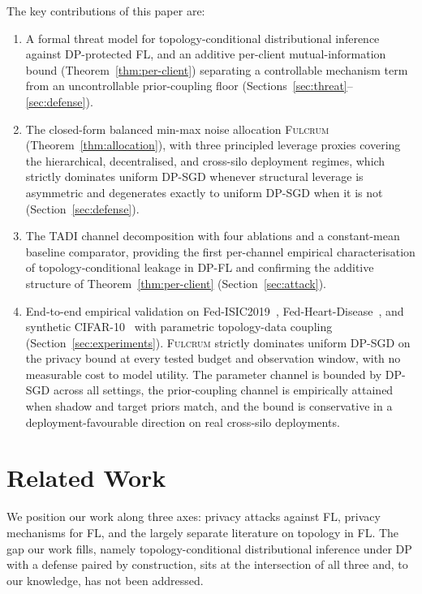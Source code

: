 \documentclass[letterpaper,journal]{IEEEtran}
\newcommand{\TADI}{\textsc{TADI}\xspace}
\newcommand{\Fulcrum}{\textsc{Fulcrum}\xspace}
\begin{document}
\noindent The key contributions of this paper are:
\begin{enumerate}[leftmargin=*,topsep=2pt,itemsep=2pt]
\item A formal threat model for topology-conditional distributional
  inference against DP-protected FL, and an additive per-client
  mutual-information bound (Theorem~\ref{thm:per-client}) separating
  a controllable mechanism term from an uncontrollable prior-coupling
  floor (Sections~\ref{sec:threat}--\ref{sec:defense}).
\item The closed-form balanced min-max noise allocation \Fulcrum
  (Theorem~\ref{thm:allocation}), with three principled leverage
  proxies covering the hierarchical, decentralised, and cross-silo
  deployment regimes, which strictly dominates uniform DP-SGD
  whenever structural leverage is asymmetric and degenerates exactly
  to uniform DP-SGD when it is not (Section~\ref{sec:defense}).
\item The \TADI channel decomposition with four ablations and a
  constant-mean baseline comparator, providing the first per-channel
  empirical characterisation of topology-conditional leakage in
  DP-FL and confirming the additive structure of
  Theorem~\ref{thm:per-client} (Section~\ref{sec:attack}).
\item End-to-end empirical validation on Fed-ISIC2019~\cite{flamby2022},
  Fed-Heart-Disease~\cite{flamby2022}, and synthetic
  CIFAR-10~\cite{krizhevsky2009cifar} with parametric topology-data
  coupling (Section~\ref{sec:experiments}). \Fulcrum strictly
  dominates uniform DP-SGD on the privacy bound at every tested
  budget and observation window, with no measurable cost to model
  utility. The parameter channel is bounded by DP-SGD across all
  settings, the prior-coupling channel is empirically attained when
  shadow and target priors match, and the bound is conservative in a
  deployment-favourable direction on real cross-silo deployments.
\end{enumerate}

\section{Related Work}
\label{sec:related}

We position our work along three axes: privacy attacks against FL,
privacy mechanisms for FL, and the largely separate literature on
topology in FL. The gap our work fills, namely topology-conditional
distributional inference under DP with a defense paired by
construction, sits at the intersection of all three and, to our
knowledge, has not been addressed.
\end{document}
